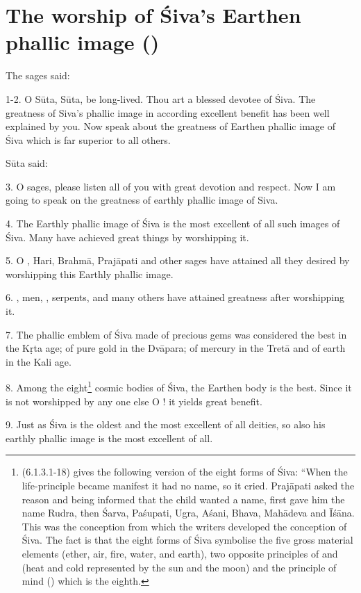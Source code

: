 \chapter{The worship of Śiva’s Earthen phallic image ()}

The sages said:

1-2. O Sūta, Sūta, be long-lived. Thou art a blessed devotee of Śiva.
The greatness of Siva’s phallic image in according excellent benefit has been
well explained by you. Now speak about the greatness of Earthen phallic image of
Śiva which is far superior to all others.

Sūta said:

3. O sages, please listen all of you with great devotion and respect. Now I am
going to speak on the greatness of earthly phallic image of Siva.

4. The Earthly phallic image of Śiva is the most excellent of all such images of
Śiva. Many  have achieved great things by worshipping it.

5. O , Hari, Brahmā, Prajāpati and other sages have attained all
they desired by worshipping this Earthly phallic image.

6. , men, , serpents,  and many
others have attained greatness after worshipping it.

7. The phallic emblem of Śiva made of precious gems was considered the best in
the Kṛta age; of pure gold in the Dvāpara; of mercury in the Tretā and of earth
in the Kali age.

8. Among the eight\footnote{ (6.1.3.1-18) gives
the following version of the eight forms of Śiva: “When the life-principle
became manifest it had no name, so it cried. Prajāpati asked the reason and
being informed that the child wanted a name, first gave him the name Rudra,
then Śarva, Paśupati, Ugra, Aśani, Bhava, Mahādeva and Īśāna. This was
the conception from which the  writers developed the 
conception of Śiva. The fact is that the eight forms of Śiva symbolise the five
gross material elements (ether, air, fire, water, and earth), two opposite
principles of  and  (heat and cold represented by the sun
and the moon) and the principle of mind () which is the eighth.}
cosmic bodies of Śiva, the Earthen body is the best. Since it is not worshipped
by any one else O ! it yields great benefit.

9. Just as Śiva is the oldest and the most excellent of all deities, so also his
earthly phallic image is the most excellent of all.

